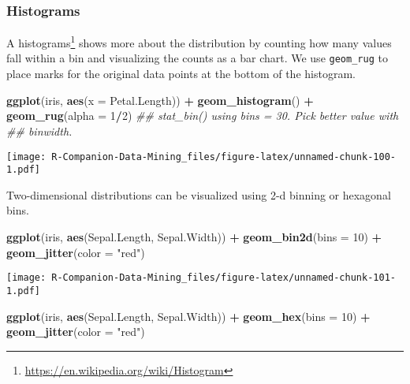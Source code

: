\documentclass[
  notitlepage]{book}
\newenvironment{Shaded}{\begin{snugshade}}{\end{snugshade}}
\newcommand{\CommentTok}[1]{\textcolor[rgb]{0.56,0.35,0.01}{\textit{#1}}}
\newcommand{\DataTypeTok}[1]{\textcolor[rgb]{0.13,0.29,0.53}{#1}}
\newcommand{\DecValTok}[1]{\textcolor[rgb]{0.00,0.00,0.81}{#1}}
\newcommand{\KeywordTok}[1]{\textcolor[rgb]{0.13,0.29,0.53}{\textbf{#1}}}
\newcommand{\NormalTok}[1]{#1}
\newcommand{\OperatorTok}[1]{\textcolor[rgb]{0.81,0.36,0.00}{\textbf{#1}}}
\newcommand{\StringTok}[1]{\textcolor[rgb]{0.31,0.60,0.02}{#1}}
\DeclareRobustCommand{\href}[2]{#2\footnote{\url{#1}}}
\begin{document}
\hypertarget{histograms}{%
\subsubsection{Histograms}\label{histograms}}

A \href{https://en.wikipedia.org/wiki/Histogram}{histograms} shows more about
the distribution by counting how many values fall within a bin and
visualizing the counts as a bar chart. We use \texttt{geom\_rug} to place marks
for the original data points at the bottom of the histogram.

\begin{Shaded}
\begin{Highlighting}[]
\KeywordTok{ggplot}\NormalTok{(iris, }\KeywordTok{aes}\NormalTok{(}\DataTypeTok{x =}\NormalTok{ Petal.Length)) }\OperatorTok{+}
\StringTok{  }\KeywordTok{geom\_histogram}\NormalTok{() }\OperatorTok{+}
\StringTok{  }\KeywordTok{geom\_rug}\NormalTok{(}\DataTypeTok{alpha =} \DecValTok{1}\OperatorTok{/}\DecValTok{2}\NormalTok{)}
\CommentTok{\#\# \textasciigrave{}stat\_bin()\textasciigrave{} using \textasciigrave{}bins = 30\textasciigrave{}. Pick better value with}
\CommentTok{\#\# \textasciigrave{}binwidth\textasciigrave{}.}
\end{Highlighting}
\end{Shaded}

\texttt{[image: R-Companion-Data-Mining\_files/figure-latex/unnamed-chunk-100-1.pdf]}

Two-dimensional distributions can be visualized using 2-d binning or
hexagonal bins.

\begin{Shaded}
\begin{Highlighting}[]
\KeywordTok{ggplot}\NormalTok{(iris, }\KeywordTok{aes}\NormalTok{(Sepal.Length, Sepal.Width)) }\OperatorTok{+}
\StringTok{  }\KeywordTok{geom\_bin2d}\NormalTok{(}\DataTypeTok{bins =} \DecValTok{10}\NormalTok{) }\OperatorTok{+}
\StringTok{  }\KeywordTok{geom\_jitter}\NormalTok{(}\DataTypeTok{color =} \StringTok{"red"}\NormalTok{)}
\end{Highlighting}
\end{Shaded}

\texttt{[image: R-Companion-Data-Mining\_files/figure-latex/unnamed-chunk-101-1.pdf]}

\begin{Shaded}
\begin{Highlighting}[]
\KeywordTok{ggplot}\NormalTok{(iris, }\KeywordTok{aes}\NormalTok{(Sepal.Length, Sepal.Width)) }\OperatorTok{+}
\StringTok{  }\KeywordTok{geom\_hex}\NormalTok{(}\DataTypeTok{bins =} \DecValTok{10}\NormalTok{) }\OperatorTok{+}
\StringTok{  }\KeywordTok{geom\_jitter}\NormalTok{(}\DataTypeTok{color =} \StringTok{"red"}\NormalTok{)}
\end{Highlighting}
\end{Shaded}
\end{document}
